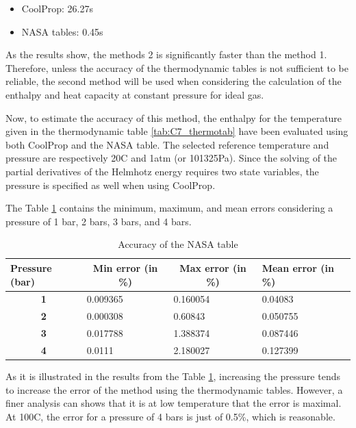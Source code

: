 \begin{itemize}
    \item CoolProp: 26.27s
    \item NASA tables: 0.45s
\end{itemize}

As the results show, the methods 2 is significantly faster than the method 1. Therefore, unless the accuracy of the thermodynamic tables is not sufficient to be reliable, the second method will be used when considering the calculation of the enthalpy and heat capacity at constant pressure for ideal gas.

Now, to estimate the accuracy of this method, the enthalpy for the temperature given in the thermodynamic table \ref{tab:C7_thermotab} have been evaluated using both CoolProp and the NASA table. The selected reference temperature and pressure are respectively 20\degree C and 1atm (or 101325Pa). Since the solving of the partial derivatives of the Helmhotz energy requires two state variables, the pressure is specified as well when using CoolProp. 

The Table \ref{tab:C7_acc_table} contains the minimum, maximum, and mean errors considering a pressure of 1 bar, 2 bars, 3 bars, and 4 bars.
\begin{longtable}[c]{@{}clll@{}}
\caption{Accuracy of the NASA table }
\label{tab:C7_acc_table}\\
\toprule
\multicolumn{1}{l}{\textbf{Pressure (bar)}} & \multicolumn{1}{c}{\textbf{Min error (in \%)}} & \multicolumn{1}{c}{\textbf{Max error (in \%)}} & \textbf{Mean error (in \%)} \\* \midrule
\endfirsthead
%
\endhead
%
\bottomrule
\endfoot
%
\endlastfoot
%
\textbf{1}                                  & 0.009365                                       & 0.160054                                       & 0.04083                     \\
\textbf{2}                                  & 0.000308                                       & 0.60843                                        & 0.050755                    \\
\textbf{3}                                  & 0.017788                                       & 1.388374                                       & 0.087446                    \\
\textbf{4}                                  & 0.0111                                         & 2.180027                                       & 0.127399                    \\* \bottomrule
\end{longtable}
As it is illustrated in the results from the Table \ref{tab:C7_acc_table}, increasing the pressure tends to increase the error of the method using the thermodynamic tables. However, a finer analysis can shows that it is at low temperature that the error is maximal. At 100\degree C, the error for a pressure of 4 bars is just of 0.5\%, which is reasonable. 

